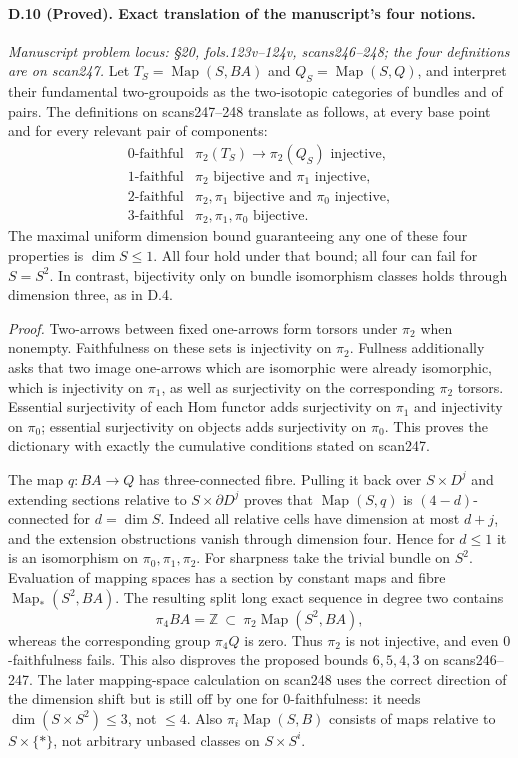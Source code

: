 \paragraph{D.10 (Proved). Exact translation of the manuscript's four notions.}
\emph{Manuscript problem locus: \S20, fols.123v--124v, scans246--248; the four definitions are on scan247.}
Let $T_S=\operatorname{Map}(S,BA)$ and $Q_S=\operatorname{Map}(S,Q)$, and interpret their fundamental two-groupoids as the two-isotopic categories of bundles and of pairs. The definitions on scans247--248 translate as follows, at every base point and for every relevant pair of components:
\[
\begin{array}{c|l}
0\text{-faithful}&\pi_2(T_S)\to\pi_2(Q_S)\text{ injective},\\
1\text{-faithful}&\pi_2\text{ bijective and }\pi_1\text{ injective},\\
2\text{-faithful}&\pi_2,\pi_1\text{ bijective and }\pi_0\text{ injective},\\
3\text{-faithful}&\pi_2,\pi_1,\pi_0\text{ bijective}.
\end{array}
\]
The maximal uniform dimension bound guaranteeing any one of these four properties is $\dim S\leq1$. All four hold under that bound; all four can fail for $S=S^2$. In contrast, bijectivity only on bundle isomorphism classes holds through dimension three, as in D.4.

\emph{Proof.} Two-arrows between fixed one-arrows form torsors under $\pi_2$ when nonempty. Faithfulness on these sets is injectivity on $\pi_2$. Fullness additionally asks that two image one-arrows which are isomorphic were already isomorphic, which is injectivity on $\pi_1$, as well as surjectivity on the corresponding $\pi_2$ torsors. Essential surjectivity of each Hom functor adds surjectivity on $\pi_1$ and injectivity on $\pi_0$; essential surjectivity on objects adds surjectivity on $\pi_0$. This proves the dictionary with exactly the cumulative conditions stated on scan247.

The map $q:BA\to Q$ has three-connected fibre. Pulling it back over $S\times D^j$ and extending sections relative to $S\times\partial D^j$ proves that $\operatorname{Map}(S,q)$ is $(4-d)$-connected for $d=\dim S$. Indeed all relative cells have dimension at most $d+j$, and the extension obstructions vanish through dimension four. Hence for $d\leq1$ it is an isomorphism on $\pi_0,\pi_1,\pi_2$. For sharpness take the trivial bundle on $S^2$. Evaluation of mapping spaces has a section by constant maps and fibre $\operatorname{Map}_*(S^2,BA)$. The resulting split long exact sequence in degree two contains
\[
\pi_4BA=\mathbb Z\ \subset\ \pi_2\operatorname{Map}(S^2,BA),
\]
whereas the corresponding group $\pi_4Q$ is zero. Thus $\pi_2$ is not injective, and even $0$-faithfulness fails. This also disproves the proposed bounds $6,5,4,3$ on scans246--247. The later mapping-space calculation on scan248 uses the correct direction of the dimension shift but is still off by one for $0$-faithfulness: it needs $\dim(S\times S^2)\leq3$, not $\leq4$. Also $\pi_i\operatorname{Map}(S,B)$ consists of maps relative to $S\times\{*\}$, not arbitrary unbased classes on $S\times S^i$.

